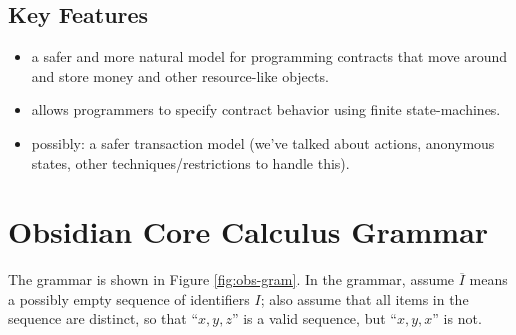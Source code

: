\documentclass[runningheads,a4paper]{llncs}
\begin{document}
\subsection{Key Features}

\begin{itemize}
\item a safer and more natural model for programming contracts that move around and store money and other resource-like objects.
\item allows programmers to specify contract behavior using finite state-machines.
\item possibly: a safer transaction model (we've talked about actions, anonymous states, other techniques/restrictions to handle this).
\end{itemize}

\fi

\section{Obsidian Core Calculus Grammar}

The grammar is shown in Figure \ref{fig:obs-gram}. In the grammar, assume $\overline{I}$ means a possibly empty sequence of identifiers $I$; also assume that all items in the sequence are distinct, so that ``$x, y, z$'' is a valid sequence, but ``$x, y, x$'' is not.\\

\newcommand{\stateS}{\texttt{state}}
\newcommand{\ownedS}{\texttt{owned}}
\newcommand{\readonlyS}{\texttt{readonly}}
\newcommand{\sharedS}{\texttt{shared}}
\newcommand{\contractS}{\texttt{contract}}
\newcommand{\extcontractS}{\texttt{external\ contract}}
\newcommand{\letS}{\texttt{let}}
\newcommand{\throwS}{\texttt{throw}}
\newcommand{\tryS}{\texttt{try}}
\newcommand{\catchS}{\texttt{catch}}
\newcommand{\thisS}{\texttt{this}}
\newcommand{\inS}{\texttt{in}}
\newcommand{\caseS}{\texttt{case}}
\newcommand{\defaultS}{\texttt{default}}
\newcommand{\newS}{\texttt{new}}
\newcommand{\permS}{\triangleright}
\newcommand{\functionS}{\texttt{function}}
\newcommand{\transactionS}{\texttt{transaction}}
\newcommand{\voidS}{\textsf{void}}
\newcommand{\unpackS}{\texttt{unpack}}
\newcommand{\packS}{\texttt{pack_to}}
\newcommand{\withS}{\texttt{returns}}
\newcommand{\asS}{\texttt{as}}
\newcommand{\ofS}{\texttt{managed_by}}
\newcommand{\trueS}{\textsf{t}}
\newcommand{\falseS}{\textsf{f}}
\newcommand{\constS}{\texttt{const}}
\newcommand{\assertS}{\texttt{assert}}
\newcommand{\resS}{\texttt{residual}}
\end{document}

